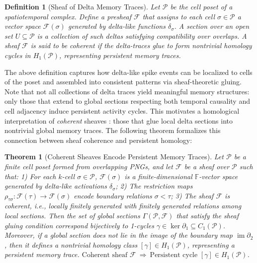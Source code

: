 \documentclass[lettersize,journal]{IEEEtran}
\newtheorem{definition}{Definition}
\newtheorem{theorem}{Theorem}
\begin{document}
\begin{definition}[Sheaf of Delta Memory Traces]
Let \( \mathcal{P} \) be the cell poset of a spatiotemporal complex. Define a presheaf \( \mathcal{F} \) that assigns to each cell \( \sigma \in \mathcal{P} \) a vector space \( \mathcal{F}(\sigma) \) generated by delta-like functions \( \delta_\sigma \). A section over an open set \( U \subseteq \mathcal{P} \) is a collection of such deltas satisfying compatibility over overlaps.
A sheaf \( \mathcal{F} \) is said to be coherent if the delta-traces glue to form nontrivial homology cycles in \( H_1(\mathcal{P}) \), representing persistent memory traces.
\end{definition}

The above definition captures how delta-like spike events can be localized to cells of the poset and assembled into consistent patterns via sheaf-theoretic gluing. Note that not all collections of delta traces yield meaningful memory structures: only those that extend to global sections respecting both temporal causality and cell adjacency induce persistent activity cycles. This motivates a homological interpretation of \emph{coherent} sheaves \cite{grauert2012coherent}: those that glue local delta sections into nontrivial global memory traces. The following theorem formalizes this connection between sheaf coherence and persistent homology:

\begin{theorem}[Coherent Sheaves Encode Persistent Memory Traces]
Let \( \mathcal{P} \) be a finite cell poset formed from overlapping PNGs, and let \( \mathcal{F} \) be a sheaf over \( \mathcal{P} \) such that:
1) For each \( k \)-cell \( \sigma \in \mathcal{P} \), \( \mathcal{F}(\sigma) \) is a finite-dimensional \( \mathbb{F} \)-vector space generated by delta-like activations \( \delta_\sigma \);
2) The restriction maps \( \rho_{\tau\sigma} : \mathcal{F}(\tau) \to \mathcal{F}(\sigma) \) encode boundary relations \( \sigma < \tau \);
3) The sheaf \( \mathcal{F} \) is coherent, i.e., locally finitely generated with finitely generated relations among local sections.
Then the set of global sections \( \Gamma(\mathcal{P}, \mathcal{F}) \) that satisfy the sheaf gluing condition correspond bijectively to 1-cycles \( \gamma \in \ker \partial_1 \subseteq C_1(\mathcal{P}) \). Moreover, if a global section does not lie in the image of the boundary map \( \operatorname{im} \partial_2 \), then it defines a nontrivial homology class \( [\gamma] \in H_1(\mathcal{P}) \), representing a persistent memory trace.
$\boxed{
\text{Coherent sheaf } \mathcal{F} \ \Longrightarrow \ \text{Persistent cycle } [\gamma] \in H_1(\mathcal{P})
}$.
\label{thm:coherent_sheaf_memory}
\end{theorem}
\end{document}
